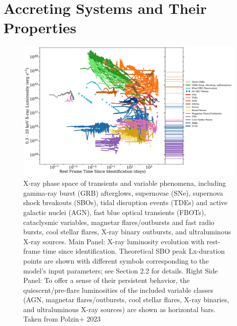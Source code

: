 \section{Accreting Systems and Their Properties}
\begin{figure}[ht!]
    \centering
    \includegraphics[width=\linewidth]{Pictures/figures/xray_sources.png}
    \caption{X-ray phase space of transients and variable phenomena, including gamma-ray burst (GRB) afterglows, supernovae (SNe), supernova shock breakouts (SBOs), tidal disruption events (TDEs) and active galactic nuclei (AGN), fast blue optical transients (FBOTs), cataclysmic variables, magnetar flares/outbursts and fast radio bursts, cool stellar flares, X-ray binary outbursts, and ultraluminous X-ray sources. Main Panel: X-ray luminosity evolution with rest-frame time since identification. Theoretical SBO peak Lx-duration points are shown with different symbols corresponding to the model’s input parameters; see Section 2.2 for details. Right Side Panel: To offer a sense of their persistent behavior, the quiescent/pre-flare luminosities of the included variable classes (AGN, magnetar flares/outbursts, cool stellar flares, X-ray binaries, and ultraluminous X-ray sources) are shown as horizontal bars. Taken from Polzin+ 2023}
    \label{fig:xray_sources}
\end{figure}

